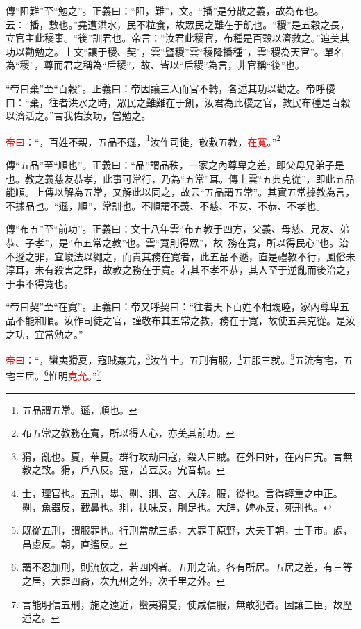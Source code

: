 {\noindent\zhuan{}\fzbyks 傳“阻難”至“勉之”。正義曰：“阻，難”，文。“播”是分散之義，故為布也。云：“播，敷也。”堯遭洪水，民不粒食，故眾民之難在于飢也。“稷”是五穀之長，立官主此稷事。“後”訓君也。帝言：“汝君此稷官，布種是百穀以濟救之。”追美其功以勸勉之。上文“讓于稷、契”，雲“暨稷”雲“稷降播種”，雲“稷為天官”。單名為“稷”，尊而君之稱為“后稷”，故、皆以“后稷”為言，非官稱“後”也。 \par}

{\noindent\shu{}\fzkt “帝曰棄”至“百穀”。正義曰：帝因讓三人而官不轉，各述其功以勸之。帝呼稷曰：“棄，往者洪水之時，眾民之難難在于飢，汝君為此稷之官，教民布種是百穀以濟活之。”言我佑汝功，當勉之。 \par}

\textcolor{red}{帝曰}：“，百姓不親，五品不遜，\footnote{五品謂五常。遜，順也。}汝作司徒，敬敷五教，\textcolor{red}{在寬}。”\footnote{布五常之教務在寬，所以得人心，亦美其前功。}

{\noindent\zhuan{}\fzbyks 傳“五品”至“順也”。正義曰：“品”謂品秩，一家之內尊卑之差，即父母兄弟子是也。教之義慈友恭孝，此事可常行，乃為“五常”耳。傳上雲“五典克從”，即此五品能順。上傳以解為五常，又解此以同之，故云“五品謂五常”。其實五常據教為言，不據品也。“遜，順”，常訓也。不順謂不義、不慈、不友、不恭、不孝也。 \par}

{\noindent\zhuan{}\fzbyks 傳“布五”至“前功”。正義曰：文十八年雲“布五教于四方，父義、母慈、兄友、弟恭、子孝”，是“布五常之教”也。雲“寬則得眾”，故“務在寬，所以得民心”也。治不遜之罪，宜峻法以繩之，而貴其務在寬者，此五品不遜，直是禮教不行，風俗未淳耳，未有殺害之罪，故教之務在于寬。若其不孝不恭，其人至于逆亂而後治之，于事不得寬也。 \par}

{\noindent\shu{}\fzkt “帝曰契”至“在寬”。正義曰：帝又呼契曰：“往者天下百姓不相親睦，家內尊卑五品不能和順。汝作司徒之官，謹敬布其五常之教，務在于寬，故使五典克從。是汝之功，宜當勉之。” \par}

\textcolor{red}{帝曰}：“，蠻夷猾夏，寇賊姦宄，\footnote{猾，亂也。夏，華夏。群行攻劫曰寇，殺人曰賊。在外曰奸，在內曰宄。言無教之致。猾，戶八反。寇，苦豆反。宄音軌。}汝作士。五刑有服，\footnote{士，理官也。五刑，墨、劓、剕、宮、大辟。服，從也。言得輕重之中正。劓，魚器反，截鼻也。剕，扶味反，刖足也。大辟，婢亦反，死刑也。}五服三就。\footnote{既從五刑，謂服罪也。行刑當就三處，大罪于原野，大夫于朝，士于市。處，昌慮反。朝，直遙反。}五流有宅，五宅三居。\footnote{謂不忍加刑，則流放之，若四凶者。五刑之流，各有所居。五居之差，有三等之居，大罪四裔，次九州之外，次千里之外。}惟明\textcolor{red}{克允}。”\footnote{言能明信五刑，施之遠近，蠻夷猾夏，使咸信服，無敢犯者。因讓三臣，故歷述之。}

